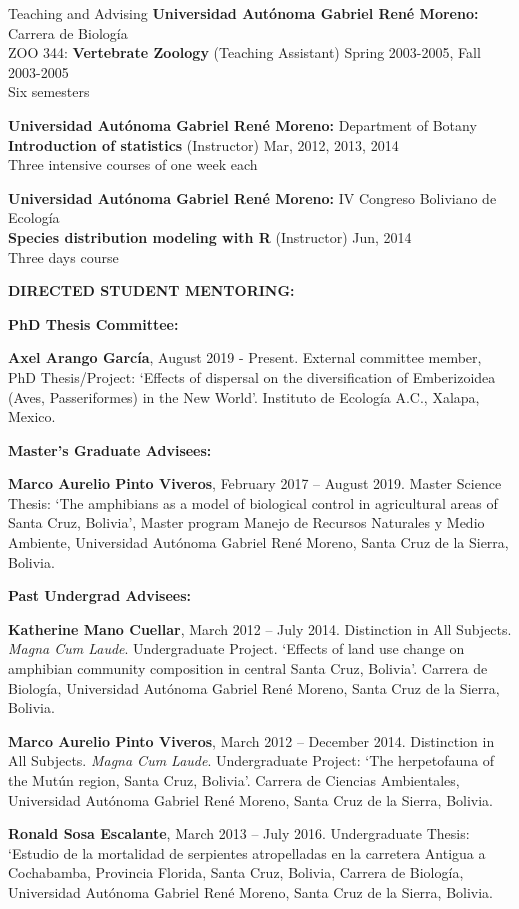 \documentclass{resume} %
\begin{document}
\begin{rSection}{Teaching and Advising}
{\bf Universidad Autónoma Gabriel René Moreno: }{Carrera de Biología } \\
ZOO 344: \textbf{Vertebrate Zoology} (Teaching Assistant) \hfill Spring 2003-2005, Fall 2003-2005 \\
{Six semesters}\smallskip 

{\bf Universidad Autónoma Gabriel René Moreno: }{Department of Botany } \\
\textbf{Introduction of statistics} (Instructor) \hfill Mar, 2012, 2013, 2014 \\
{Three intensive courses of one week each}\smallskip 

{\bf Universidad Autónoma Gabriel René Moreno: }{IV Congreso Boliviano de Ecología } \\
\textbf{Species distribution modeling with R} (Instructor) \hfill Jun, 2014 \\
{Three days course}\smallskip 

\textbf{DIRECTED STUDENT MENTORING:}

\textbf{PhD Thesis Committee:}

\textbf{Axel Arango García}, August 2019 - Present. External committee member, PhD Thesis/Project: `Effects of dispersal on the diversification of Emberizoidea (Aves, Passeriformes) in the New World'. Instituto de Ecología A.C., Xalapa, Mexico. 

\textbf{Master's Graduate Advisees:}

\textbf{Marco Aurelio Pinto Viveros}, February 2017 – August 2019. Master Science Thesis: `The amphibians as a model of biological control in agricultural areas of Santa Cruz, Bolivia', Master program Manejo de Recursos Naturales y Medio Ambiente, Universidad Autónoma Gabriel René Moreno, Santa Cruz de la Sierra, Bolivia.

\textbf{Past Undergrad Advisees:}

\textbf{Katherine Mano Cuellar}, March 2012 – July 2014. Distinction in All Subjects. {\em Magna Cum Laude}. Undergraduate Project. `Effects of land use change on amphibian community composition in central Santa Cruz, Bolivia'. Carrera de Biología, Universidad Autónoma Gabriel René Moreno, Santa Cruz de la Sierra, Bolivia.

\textbf{Marco Aurelio Pinto Viveros}, March 2012 – December 2014. Distinction in All Subjects. {\em Magna Cum Laude}. Undergraduate Project: `The herpetofauna of the Mutún region, Santa Cruz, Bolivia'. Carrera de Ciencias Ambientales, Universidad Autónoma Gabriel René Moreno, Santa Cruz de la Sierra, Bolivia.

\textbf{Ronald Sosa Escalante}, March 2013 – July 2016. Undergraduate Thesis: `Estudio de la mortalidad de serpientes atropelladas en la carretera Antigua a Cochabamba, Provincia Florida, Santa Cruz, Bolivia, Carrera de Biología, Universidad Autónoma Gabriel René Moreno, Santa Cruz de la Sierra, Bolivia.

\end{rSection}
\end{document}

